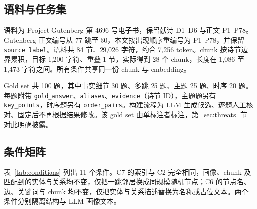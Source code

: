 \documentclass[11pt,a4paper]{ctexart}
\begin{document}
\subsection{语料与任务集}

语料为 Project Gutenberg 第 4696 号电子书，保留献诗 D1--D6 与正文 P1--P78。Gutenberg 正文编号从 77 跳至 80，本文按出现顺序重编号为 P1--P78，并保留 \texttt{source\_label}。语料共 84 节、29,026 字符，约合 7,256 token。chunk 按诗节边界累积，目标 1,200 字符、重叠 1 节，实际得到 28 个 chunk，长度在 1,086 至 1,473 字符之间。所有条件共享同一份 chunk 与 embedding。

Gold set 共 100 题，其中事实细节 30 题、多跳 25 题、主题 25 题、时序 20 题。每题附带 \texttt{gold\_answer}、\texttt{aliases}、\texttt{evidence}（诗节 ID），主题题另有 \texttt{key\_points}，时序题另有 \texttt{order\_pairs}。构建流程为 LLM 生成候选、逐题人工核对、固定后不再根据结果修改。该 gold set 由单标注者标注，第~\ref{sec:threats} 节对此明确披露。

\subsection{条件矩阵}

表~\ref{tab:conditions} 列出 11 个条件。C7 的索引与 C2 完全相同，画像、chunk 及匹配到的实体与关系均不变，仅把一跳邻居换成同规模随机节点；C6 的节点名、边、关键词与 chunk 均不变，仅把实体与关系描述替换为名称或占位文本。两个条件分别隔离结构与 LLM 画像文本。
\end{document}
